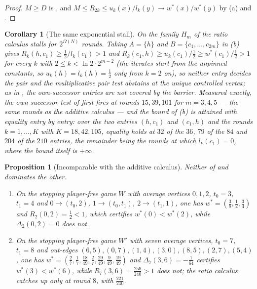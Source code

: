 \documentclass[11pt]{article}
\theoremstyle{plain}
\newtheorem{proposition}[theorem]{Proposition}
\newtheorem{corollary}[theorem]{Corollary}
\theoremstyle{definition}
\begin{document}
\begin{proof}
$M\ge D$ is , and
$M\le R_{2k}\le u_k(x)/l_k(y)\to w^\ast(x)/w^\ast(y)$ by
(a) and .
\end{proof}

\begin{corollary}[The same exponential stall]\label{cor:ratio-stall}
On the family $H_m$ of  the ratio calculus stalls
for $2^{\Omega(N)}$ rounds. Taking $A=\{h\}$ and $B=\{c_1,\dots,c_{2m}\}$
in (b) gives
$R_k(h,c_1)\ge\tfrac12/l_k(c_1)>1$ and
$R_k(c_1,h)\ge u_k(c_1)/\tfrac12\ge w^\ast(c_1)/\tfrac12>1$ for every
$k$ with $2\le k<\ln2\cdot2^{m-2}$ (the iterates start from the unpinned
constants, so $u_k(h)=l_k(h)=\tfrac12$ only from $k=2$ on), so neither
entry decides the pair and the multiplicative pair test abstains at the
unique controlled vertex; as in , the
own-successor entries are not covered by the barrier. Measured exactly,
the own-successor test of  first fires at rounds
$15,39,101$ for $m=3,4,5$ --- the same rounds as the additive calculus
--- and the bound of (b) is attained with
equality entry by entry: over the two entries $(h,c_1)$ and $(c_1,h)$ and
the rounds $k=1,\dots,K$ with $K=18,42,105$, equality holds at $32$ of the
$36$, $79$ of the $84$ and $204$ of the $210$ entries, the remainder being
the rounds at which $l_k(c_1)=0$, where the bound itself is $+\infty$.
\end{corollary}

\begin{proposition}[Incomparable with the additive
calculus]\label{prop:ratio-incomparable}
Neither of  and  dominates the other.
\begin{enumerate}[label=(\alph*),leftmargin=2.2em]
\item On the stopping player-free game $W$ with average vertices $0,1,2$,
      $t_0=3$, $t_1=4$ and $0\to(t_0,2)$, $1\to(t_0,t_1)$, $2\to(t_1,1)$,
      one has $w^\ast=(\tfrac38,\tfrac12,\tfrac34)$ and
      $R_2(0,2)=\tfrac12<1$, which certifies $w^\ast(0)<w^\ast(2)$, while
      $\Delta_2(0,2)=0$ does not.
\item On the stopping player-free game $W'$ with seven average vertices,
      $t_0=7$, $t_1=8$ and out-edges
      $(6,5),(0,7),(1,4),(3,0),(8,5),(2,7),(5,4)$, one has
      $w^\ast=(\tfrac27,\tfrac17,\tfrac{18}{49},\tfrac27,\tfrac{29}{49},
      \tfrac9{49},\tfrac{19}{49})$ and $\Delta_7(3,6)=-\tfrac1{64}$
      certifies $w^\ast(3)<w^\ast(6)$, while $R_7(3,6)=\tfrac{259}{240}>1$
      does not; the ratio calculus catches up only at round $8$, with
      $\tfrac{221}{240}$.
\end{enumerate}
\end{proposition}
\end{document}
